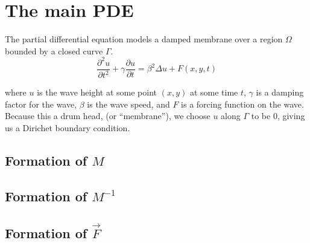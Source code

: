 \documentclass[a4paper,12pt]{article}
\begin{document}
\newcommand{\innerproduct}[2]{\int\limits_{\Omega} #1 #2 d\Omega}
\newcommand{\innerproductdot}[2]{\int\limits_{\Omega} \nabla #1 \cdot \nabla #2 d\Omega}
\newcommand{\firstderivative}[2]{\frac{d #1}{d #2}}
\newcommand{\secondderivative}[2]{\frac{d^2 #1}{d #2^2}}
\newcommand{\firstpartial}[2]{\frac{\partial #1}{\partial #2}}
\newcommand{\secondpartial}[2]{\frac{\partial^2 #1}{\partial #2^2}}
\newcommand{\laplacian}[1]{\Delta #1}
\newcommand{\secondfinitediff}[1]{\frac{#1^{n+1} - 2#1^n + #1^{n-1}}{\delta t^2}}
\newcommand{\firstfinitediff}[1]{\frac{#1^{n+1} - #1^{n-1}}{2\delta t}}
\newcommand{\step}[1]{\left( \frac{1}{\delta t^2} #1 \frac{\gamma}{2\delta t} \right)}
\newcommand{\mat}[2][rrrr]{
    \left(\begin{array}{#1}
    #2 \\
    \end{array}
    \right)
}

\section{The main PDE}
The partial differential equation models a damped membrane over a region $\Omega$ bounded by a closed curve $\Gamma$.
\begin{equation} \label{eq:main_pde}
\secondpartial{u}{t} + \gamma \firstpartial{u}{t}
=
\beta^2 \laplacian{u} + F(x,y,t)
\end{equation}

where $u$ is the wave height at some point $(x,y)$ at some time $t$, $\gamma$ is a damping factor for the wave,
$\beta$ is the wave speed, and $F$ is a forcing function on the wave. Because this a drum head, (or ``membrane''), we choose
$u$ along $\Gamma$ to be 0, giving us a Dirichet boundary condition.





\subsection{Formation of $M$}
\subsection{Formation of $M^{-1}$}
\subsection{Formation of $\vec{F}$}



\end{document}
